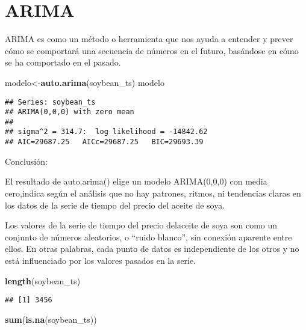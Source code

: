\documentclass[
]{book}
\newenvironment{Shaded}{\begin{snugshade}}{\end{snugshade}}
\newcommand{\FunctionTok}[1]{\textcolor[rgb]{0.13,0.29,0.53}{\textbf{#1}}}
\newcommand{\NormalTok}[1]{#1}
\newcommand{\OtherTok}[1]{\textcolor[rgb]{0.56,0.35,0.01}{#1}}
\begin{document}
\hypertarget{arima}{%
\chapter{ARIMA}\label{arima}}

ARIMA es como un método o herramienta que nos ayuda a entender y prever cómo se comportará una secuencia de números en el futuro, basándose en cómo se ha comportado en el pasado.

\begin{Shaded}
\begin{Highlighting}[]
\NormalTok{modelo}\OtherTok{\textless{}{-}}\FunctionTok{auto.arima}\NormalTok{(soybean\_ts)}
\NormalTok{modelo}
\end{Highlighting}
\end{Shaded}

\begin{verbatim}
## Series: soybean_ts 
## ARIMA(0,0,0) with zero mean 
## 
## sigma^2 = 314.7:  log likelihood = -14842.62
## AIC=29687.25   AICc=29687.25   BIC=29693.39
\end{verbatim}

Conclusión:

El resultado de auto.arima() elige un modelo ARIMA(0,0,0) con media cero,indica según el análisis que no hay patrones, ritmos, ni tendencias claras en los datos de la serie de tiempo del precio del aceite de soya.

Los valores de la serie de tiempo del precio delaceite de soya son como un conjunto de números aleatorios, o ``ruido blanco'', sin conexión aparente entre ellos. En otras palabras, cada punto de datos es independiente de los otros y no está influenciado por los valores pasados en la serie.

\begin{Shaded}
\begin{Highlighting}[]
\FunctionTok{length}\NormalTok{(soybean\_ts)}
\end{Highlighting}
\end{Shaded}

\begin{verbatim}
## [1] 3456
\end{verbatim}

\begin{Shaded}
\begin{Highlighting}[]
\FunctionTok{sum}\NormalTok{(}\FunctionTok{is.na}\NormalTok{(soybean\_ts))}
\end{Highlighting}
\end{Shaded}
\end{document}
